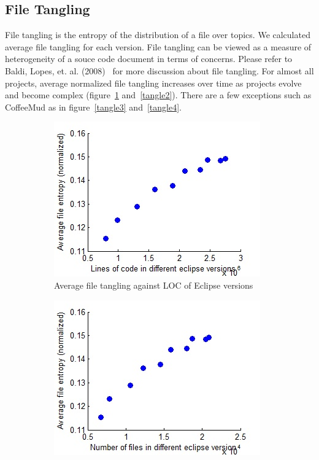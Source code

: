 \documentclass[12pt]{article}
\begin{document}
\subsection{File Tangling}
File tangling is the entropy of the distribution of a file over topics. We calculated average file tangling for each version. File tangling can be viewed as a measure of heterogeneity of a souce code document in terms of concerns. Please refer to Baldi, Lopes, et. al. (2008)~\cite{Baldi:2008:TAL:1449955.1449807} for more discussion about file tangling.
For almost all projects, average normalized file tangling increases over time as projects evolve and become complex (figure~\ref{tangle1} and~\ref{tangle2}). There are a few exceptions such as CoffeeMud as in figure~\ref{tangle3} and~\ref{tangle4}.
\begin{figure}
        \centering
        \begin{subfigure}[b]{0.5\textwidth}
                \centering
                \includegraphics[width=\textwidth]{average-tangling-vs-loc-eclipse.jpg}
                \caption{Average file tangling against LOC of Eclipse versions}
                \label{tangle1}
        \end{subfigure}%
        \begin{subfigure}[b]{0.5\textwidth}
                \centering
                \includegraphics[width=\textwidth]{average-tangling-vs-num-files-eclipse.jpg}

\end{subfigure}
\end{figure}
\end{document}

